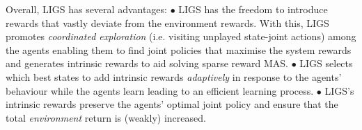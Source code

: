 \documentclass{article}
\begin{document}
Overall, LIGS has several advantages:  
\newline$\bullet$ LIGS has the freedom to introduce rewards that vastly deviate from the environment rewards. With this, LIGS promotes \textit{coordinated exploration} (i.e. visiting unplayed state-joint actions) among the agents enabling them to find joint policies that maximise the system rewards and generates intrinsic rewards to aid solving sparse reward MAS.
\newline$\bullet$ LIGS selects which best states to add intrinsic rewards \textit{adaptively} in response to the agents' behaviour while the agents learn leading to an efficient learning process.
\newline$\bullet$ LIGS's intrinsic rewards preserve the agents' optimal joint policy and ensure that the total \textit{environment} return is (weakly) increased.
\end{document}
